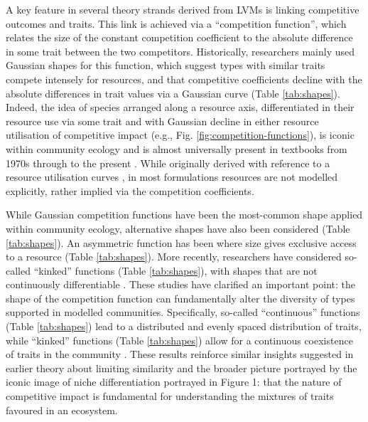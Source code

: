 \documentclass[a4paper,11pt]{article}
\begin{document}
A key feature in several theory strands derived from LVMs is linking competitive outcomes and traits. This link is achieved via a ``competition function'', which relates the size of the constant competition coefficient to the absolute difference in some trait between the two competitors. Historically, researchers mainly used Gaussian shapes for this function, which suggest types with similar traits compete intensely for resources, and that competitive coefficients decline with the absolute differences in trait values via a Gaussian curve (Table \ref{tab:shapes}). Indeed, the idea of species arranged along a resource axis, differentiated in their resource use via some trait and with Gaussian decline in either resource utilisation of competitive impact (e.g., Fig. \ref{fig:competition-functions}), is iconic within community ecology and is almost universally present in textbooks from 1970s through to the present \citep[e.g.,][]{Krebs-1972, Ricklefs-1973, Ricklefs-1999, Krebs-2013}. While originally derived with reference to a resource utilisation curves \citep{MacArthur-1967, Roughgarden-1979}, in most formulations resources are not modelled explicitly, rather implied via the competition coefficients.

While Gaussian competition functions have been the most-common shape applied within community ecology, alternative shapes have also been considered (Table \ref{tab:shapes}). An asymmetric function has been where size gives exclusive access to a resource \citep[e.g.]{Law-1997, Kisdi-1999, Geritz-1999, Egas-2004, Calcagno-2006, DAndrea-2013} (Table \ref{tab:shapes}). More recently, researchers have considered so-called ``kinked'' functions (Table \ref{tab:shapes}), with shapes that are not continuously differentiable \citep{Calcagno-2006, Scheffer-2006, Pigolotti-2007, Leimar-2013, Barabas-2013}. These studies have clarified an important point: the shape of the competition function can fundamentally alter the diversity of types supported in modelled communities. Specifically, so-called ``continuous'' functions (Table \ref{tab:shapes}) lead to a distributed and evenly spaced distribution of traits, while ``kinked'' functions (Table \ref{tab:shapes}) allow for a continuous coexistence of traits in the community \citep{Scheffer-2006, Pigolotti-2007, Leimar-2013, Barabas-2013, DAndrea-2013}. These results reinforce similar insights suggested in earlier theory about limiting similarity \citep{Abrams-1983} and the broader picture portrayed by the iconic image of niche differentiation portrayed in Figure 1: that the nature of competitive impact is fundamental for understanding the mixtures of traits favoured in an ecosystem.
\end{document}
